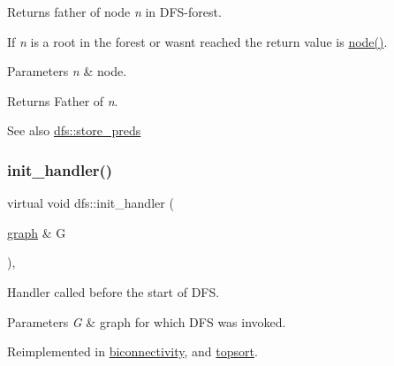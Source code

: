 Returns father of node {\itshape n} in D\+F\+S-\/forest. 

If {\itshape n} is a root in the forest or wasn\textquotesingle{}t reached the return value is {\ttfamily \mbox{\hyperlink{classnode}{node()}}}.


\begin{DoxyParams}{Parameters}
{\em n} & node. \\
\hline
\end{DoxyParams}
\begin{DoxyReturn}{Returns}
Father of {\itshape n}. 
\end{DoxyReturn}
\begin{DoxySeeAlso}{See also}
\mbox{\hyperlink{classdfs_a7043f46eb3887cbcbb1391fc783407a4}{dfs\+::store\+\_\+preds}} 
\end{DoxySeeAlso}
\mbox{\label{classdfs_acc82574cd42ab8256e685374bee5fabb}} 
\subsubsection{\texorpdfstring{init\+\_\+handler()}{init\_handler()}}
{\footnotesize\ttfamily virtual void dfs\+::init\+\_\+handler (\begin{DoxyParamCaption}\item[{\mbox{\hyperlink{classgraph}{graph}} \&}]{G }\end{DoxyParamCaption})\hspace{0.3cm}{\ttfamily [inline]}, {\ttfamily [virtual]}}



Handler called before the start of D\+FS. 


\begin{DoxyParams}{Parameters}
{\em G} & graph for which D\+FS was invoked. \\
\hline
\end{DoxyParams}


Reimplemented in \mbox{\hyperlink{classbiconnectivity_a64adab869e0080e3a1f8479e70010317}{biconnectivity}}, and \mbox{\hyperlink{classtopsort_a21aaf28fc280094ed43288e58d8e3ae1}{topsort}}.

\mbox{\label{classdfs_a8071fc4e82deff7ceb2790cd4eb42280}} 
